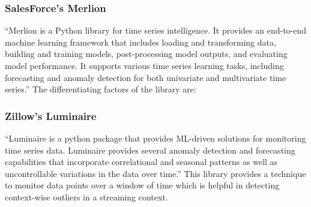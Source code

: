 \subsubsection{SalesForce's Merlion}
\enquote{Merlion is a Python library for time series intelligence. It provides an end-to-end machine learning framework that includes loading and transforming data, building and training models, post-processing model outputs, and evaluating model performance. It supports various time series learning tasks, including forecasting and anomaly detection for both univariate and multivariate time series.} 
The differentiating factors of the library are:

\subsubsection{Zillow's Luminaire}

\enquote{Luminaire is a python package that provides ML-driven solutions for monitoring time series data. Luminaire provides several anomaly detection and forecasting capabilities that incorporate correlational and seasonal patterns as well as uncontrollable variations in the data over time.} This library provides a technique to monitor data points over a window of time which is helpful in detecting context-wise outliers in a streaming context.






